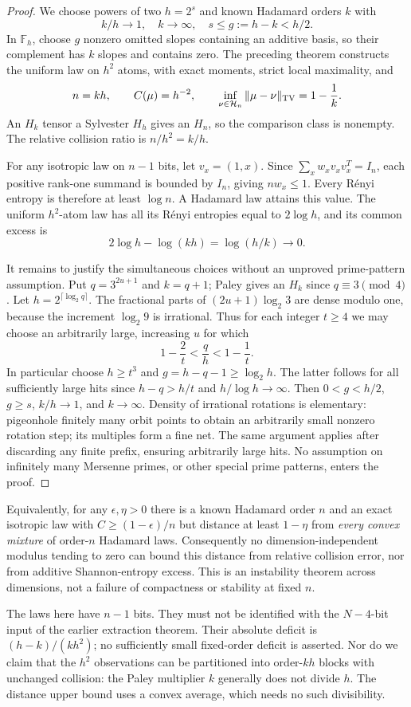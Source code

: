 \begin{proof}
We choose powers of two $h=2^s$ and known Hadamard orders $k$ with
\[
 k/h\to1,\quad k\to\infty,\quad
 s\le g:=h-k<h/2.
\]
In $\mathbb F_h$, choose $g$ nonzero omitted slopes containing an
additive basis, so their complement has $k$ slopes and contains zero.
The preceding theorem constructs the uniform law on $h^2$ atoms,
with exact moments, strict local maximality, and
\[
 n=kh,\qquad C(\mu)=h^{-2},\qquad
 \inf_{\nu\in\mathcal H_n}\|\mu-\nu\|_{\rm TV}=1-\frac1k.
\]
An $H_k$ tensor a Sylvester $H_h$ gives an $H_n$, so the comparison
class is nonempty. The relative collision ratio is $n/h^2=k/h$.

For any isotropic law on $n-1$ bits, let $v_x=(1,x)$.
Since $\sum_xw_xv_xv_x^T=I_n$, each positive rank-one summand
is bounded by $I_n$, giving $nw_x\le1$.
Every R\'enyi entropy is therefore at least $\log n$.
A Hadamard law attains this value. The uniform $h^2$-atom law has
all its R\'enyi entropies equal to $2\log h$, and its common excess is
\[
                  2\log h-\log(kh)=\log(h/k)\to0.
\]

It remains to justify the simultaneous choices without an unproved
prime-pattern assumption. Put $q=3^{2u+1}$ and $k=q+1$; Paley gives
an $H_k$ since $q\equiv3\pmod4$. Let
$h=2^{\lceil\log_2 q\rceil}$. The fractional parts of
$(2u+1)\log_2 3$ are dense modulo one, because the increment
$\log_2 9$ is irrational. Thus for each integer $t\ge4$ we may choose
an arbitrarily large, increasing $u$ for which
\[
       1-\frac2t<\frac qh<1-\frac1t.
\]
In particular choose $h\ge t^3$ and
$g=h-q-1\ge\log_2h$. The latter follows for all sufficiently large
hits since $h-q>h/t$ and $h/\log h\to\infty$.
Then $0<g<h/2$, $g\ge s$, $k/h\to1$, and $k\to\infty$.
Density of irrational rotations is elementary: pigeonhole finitely
many orbit points to obtain an arbitrarily small nonzero rotation
step; its multiples form a fine net. The same argument applies
after discarding any finite prefix, ensuring arbitrarily large hits.
No assumption on infinitely many Mersenne primes, or other special
prime patterns, enters the proof.
\end{proof}

Equivalently, for any $\epsilon,\eta>0$ there is a known Hadamard
order $n$ and an exact isotropic law with
$C\ge(1-\epsilon)/n$ but distance at least $1-\eta$ from
\emph{every convex mixture} of order-$n$ Hadamard laws.
Consequently no dimension-independent modulus tending to zero can
bound this distance from relative collision error, nor from additive
Shannon-entropy excess. This is an instability theorem across
dimensions, not a failure of compactness or stability at fixed $n$.

The laws here have $n-1$ bits. They must not be identified with the
$N-4$-bit input of the earlier extraction theorem. Their absolute
deficit is $(h-k)/(kh^2)$; no sufficiently small fixed-order deficit
is asserted. Nor do we claim that the $h^2$ observations can be
partitioned into order-$kh$ blocks with unchanged collision:
the Paley multiplier $k$ generally does not divide $h$. The distance
upper bound uses a convex average, which needs no such divisibility.
